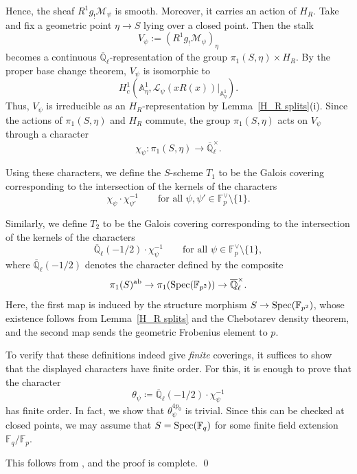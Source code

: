 \documentclass[12pt,a4paper]{amsart}
\theoremstyle{definition}
\def\A{{\mathbb A}}
\def\F{{\mathbb F}}
\def\Ql{\overline{\mathbb{Q}}_\ell}
\theoremstyle{remark}
\begin{document}
{Hence, the sheaf $R^1g_!\mathcal{M}_\psi$ is smooth. Moreover, it carries an action of $H_R$. 
Take and fix a geometric point $\eta\to S$ lying over a closed point. Then the stalk 
\[
V_\psi:=(R^1g_!\mathcal{M}_\psi)_\eta
\]
becomes a continuous $\Ql$-representation of the group $\pi_1(S,\eta)\times H_R$. By the proper base change theorem, $V_\psi$ is isomorphic to 
\[
H^1_c(\A^1_\eta,\mathcal{L}_\psi(xR(x))|_{\A^1_\eta}). 
\]
Thus, $V_\psi$ is irreducible as an $H_R$-representation by Lemma~\ref{H_R splits}(i). Since the actions of $\pi_1(S,\eta)$ and $H_R$ commute,  the group $\pi_1(S,\eta)$ acts on $V_\psi$ through a character 
\[\chi_\psi\colon \pi_1(S,\eta)\to\Ql^\times. \]

Using these characters, we define the $S$-scheme $T_1$ to be the Galois covering corresponding to the intersection of the kernels of the characters 
    \[
    \chi_\psi\cdot\chi_{\psi'}^{-1}\qquad\text{for all }\psi,\psi'\in \F_p^\vee\setminus\{1\}. 
    \]

Similarly, we define $T_2$ to be the Galois covering corresponding to the intersection of the kernels of the characters 
    \[
    \Ql(-1/2)\cdot\chi_\psi^{-1}\qquad\text{for all }\psi\in\F_p^\vee\setminus\{1\}, 
    \]
    where $\Ql(-1/2)$ denotes the 
character defined by the composite 
\[\pi_1(S)^{\mathrm{ab}} \to \pi_1({\rm Spec}(\F_{p^2}))\to\Ql^\times.\]
Here, the first map is induced by the structure morphism $S\to{\rm Spec}(\F_{p^2})$, whose existence follows from Lemma~\ref{H_R splits} and the Chebotarev density theorem, and the 
second map sends the geometric Frobenius element to $p$. 
    
To verify that these definitions indeed give \emph{finite} coverings, it suffices to show that the displayed characters have finite order. For this, it is enough to prove that the character 
\[
\theta_\psi\coloneqq \Ql(-1/2)\cdot \chi_\psi^{-1}
\]
has finite order. In fact, we show that $\theta_\psi^{4p_0}$ is trivial. Since this can be checked at closed points, we may assume that $S={\rm Spec}(\F_q)$ for some finite field extension $\F_q/\F_p$. 

This follows from \cite[Theorem 1.2(1)]{TT}, and the proof is complete.
 \qed}





 
\end{document}
